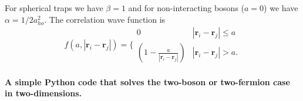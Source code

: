 For spherical traps we have $\beta = 1$ and for non-interacting
bosons ($a=0$) we have $\alpha = 1/2a_{ho}^2$.  The correlation wave
 function is
 \begin{equation}
    f(a,|\mathbf{r}_i-\mathbf{r}_j|)=\Bigg\{
 \begin{array}{ll}
	 0 & {|\mathbf{r}_i-\mathbf{r}_j|} \leq {a}\\
	 (1-\frac{a}{|\mathbf{r}_i-\mathbf{r}_j|}) & {|\mathbf{r}_i-\mathbf{r}_j|} > {a}.
 \end{array}
 \end{equation}  

\paragraph{A simple Python code that solves the two-boson or two-fermion case in two-dimensions.}













































































































